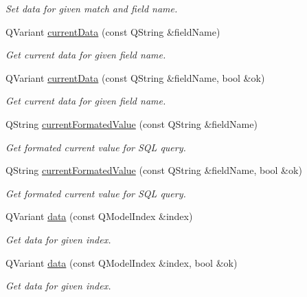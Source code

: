 \begin{DoxyCompactItemize}
\begin{DoxyCompactList}\small\item\em Set data for given match and field name. \end{DoxyCompactList}\item 
Q\-Variant \hyperlink{classmdt_abstract_sql_table_controller_a055b69caef2670ea1ba6a5095167663f}{current\-Data} (const Q\-String \&field\-Name)
\begin{DoxyCompactList}\small\item\em Get current data for given field name. \end{DoxyCompactList}\item 
Q\-Variant \hyperlink{classmdt_abstract_sql_table_controller_a3477c9a155627cb08b660182a6ad6ff4}{current\-Data} (const Q\-String \&field\-Name, bool \&ok)
\begin{DoxyCompactList}\small\item\em Get current data for given field name. \end{DoxyCompactList}\item 
Q\-String \hyperlink{classmdt_abstract_sql_table_controller_a0af4c6d87f3d5b1ba7220c58e865dd1f}{current\-Formated\-Value} (const Q\-String \&field\-Name)
\begin{DoxyCompactList}\small\item\em Get formated current value for S\-Q\-L query. \end{DoxyCompactList}\item 
Q\-String \hyperlink{classmdt_abstract_sql_table_controller_a43311c27eab3a892fd079164abf3501f}{current\-Formated\-Value} (const Q\-String \&field\-Name, bool \&ok)
\begin{DoxyCompactList}\small\item\em Get formated current value for S\-Q\-L query. \end{DoxyCompactList}\item 
Q\-Variant \hyperlink{classmdt_abstract_sql_table_controller_a1801a01c0ce073c2e389b20f58a3d3ff}{data} (const Q\-Model\-Index \&index)
\begin{DoxyCompactList}\small\item\em Get data for given index. \end{DoxyCompactList}\item 
Q\-Variant \hyperlink{classmdt_abstract_sql_table_controller_a25fec3a81261364e248332a71b01822e}{data} (const Q\-Model\-Index \&index, bool \&ok)
\begin{DoxyCompactList}\small\item\em Get data for given index. \end{DoxyCompactList}\item 

\end{DoxyCompactItemize}
